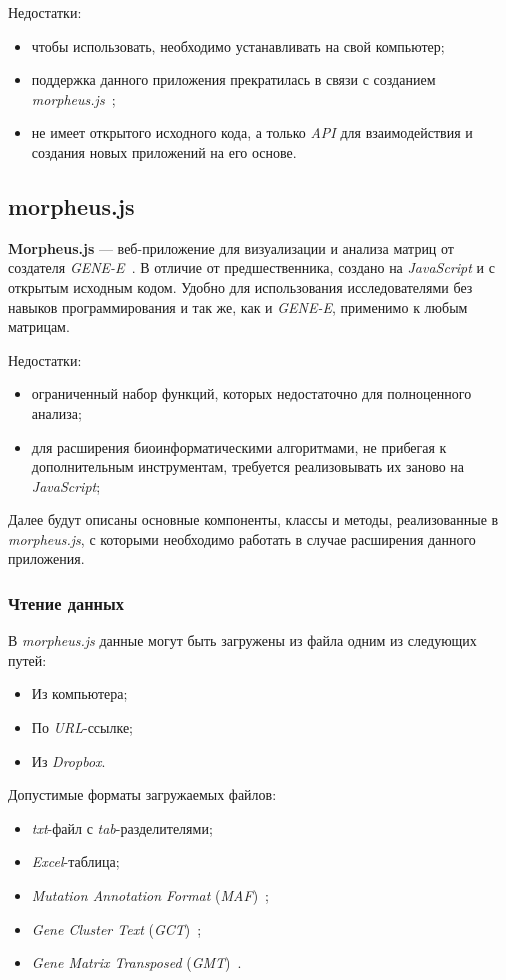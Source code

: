 Недостатки:
\begin{itemize}
\item чтобы использовать, необходимо устанавливать на свой компьютер;
\item поддержка данного приложения прекратилась в связи с созданием \emph{morpheus.js}~\cite{morpheus};
\item не имеет открытого исходного кода, а только \emph{API} для взаимодействия и создания новых приложений на его основе.
\end{itemize}

\subsection{morpheus.js}
\textbf{Morpheus.js} --- веб-приложение для визуализации и анализа матриц от создателя \emph{GENE-E}~\cite{morpheus}. В отличие от предшественника, создано на \emph{JavaScript} и с открытым исходным кодом. Удобно для использования исследователями без навыков программирования и так же, как и \emph{GENE-E}, применимо к любым матрицам.

Недостатки:
\begin{itemize}
\item ограниченный набор функций, которых недостаточно для полноценного анализа;
\item для расширения биоинформатическими алгоритмами, не прибегая к дополнительным инструментам, требуется реализовывать их заново на \emph{JavaScript};
\end{itemize}

Далее будут описаны основные компоненты, классы и методы, реализованные в \emph{morpheus.js}, с которыми необходимо работать в случае расширения данного приложения.

\subsubsection{Чтение данных}
В \emph{morpheus.js} данные могут быть загружены из файла одним из следующих путей:
\begin{itemize}
\item Из компьютера;
\item По \emph{URL}-ссылке;
\item Из \emph{Dropbox}.
\end{itemize}

Допустимые форматы загружаемых файлов:
\begin{itemize}
\item \emph{txt}-файл с \emph{tab}-разделителями;
\item \emph{Excel}-таблица;
\item \emph{Mutation Annotation Format} (\emph{MAF})~\cite{maf};
\item \emph{Gene Cluster Text} (\emph{GCT})~\cite{gct};
\item \emph{Gene Matrix Transposed} (\emph{GMT})~\cite{gmt}.
\end{itemize}

